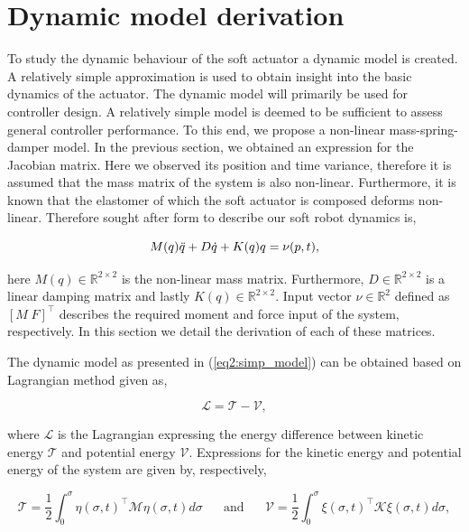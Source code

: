 \section{Dynamic model derivation}


To study the dynamic behaviour of the soft actuator a dynamic model is created. A relatively simple approximation is used to obtain insight into the basic dynamics of the actuator. The dynamic model will primarily be used for controller design. A relatively simple model is deemed to be sufficient to assess general controller performance. To this end, we propose a non-linear mass-spring-damper model. In the previous section, we obtained an expression for the Jacobian matrix. Here we observed its position and time variance, therefore it is assumed that the mass matrix of the system is also non-linear. Furthermore, it is known that the elastomer of which the soft actuator is composed deforms non-linear. Therefore sought after form to describe our soft robot dynamics is,


\begin{equation}
    M(q)\Ddot{q} + D\dot{q} + K(q)q = \nu(p,t),
    \label{eq2:simp_model}
\end{equation}


here $M(q) \in \mathbb{R}^{2\times 2}$ is the non-linear mass matrix. Furthermore, $D \in \mathbb{R}^{2\times2}$ is a linear damping matrix and lastly $K(q) \in \mathbb{R}^{2\times 2}$. Input vector $\nu \in \mathbb{R}^2$ defined as $[M \hspace{3pt} F]^\top$ describes the required moment and force input of the system, respectively. In this section we detail the derivation of each of these matrices. 

The dynamic model as presented in (\ref{eq2:simp_model}) can be obtained based on Lagrangian method given as,

\begin{equation}
\mathcal{L} = \mathcal{T} - \mathcal{V}, 
\end{equation}

where $\mathcal{L}$ is the Lagrangian expressing the energy difference between kinetic energy $\mathcal{T}$ and potential energy $\mathcal{V}$. Expressions for the kinetic energy and potential energy of the system are given by, respectively,

\begin{equation}
    \mathcal{T} = \frac{1}{2}\int_0^{\sigma} \eta(\sigma,t)^\top \mathcal{M} \eta(\sigma,t) d \sigma \hspace{20pt} \text{and} \hspace{20pt}  \mathcal{V} = \frac{1}{2}\int_0^{\sigma} \xi(\sigma,t)^\top \mathcal{K} \xi(\sigma,t) d \sigma,
    \label{eq2:T}
\end{equation}


